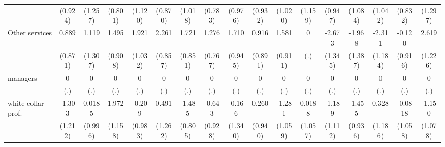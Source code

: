 {\begin{tabular}{l*{16}{c}}
                    &     (0.924)         &     (1.257)         &     (0.801)         &     (1.120)         &     (0.870)         &     (1.018)         &     (0.783)         &     (0.976)         &     (0.932)         &     (1.020)         &     (1.159)         &     (0.947)         &     (1.084)         &     (1.042)         &     (0.832)         &     (1.297)         \\
[1em]
Other services      &       0.889         &       1.119         &       1.495         &       1.921         &       2.261\sym{**} &       1.721\sym{*}  &       1.276         &       1.710         &       0.916         &       1.581         &           0         &      -2.673\sym{*}  &      -1.968         &      -2.311         &      -0.120         &       2.619\sym{*}  \\
                    &     (0.871)         &     (1.307)         &     (0.908)         &     (1.032)         &     (0.857)         &     (0.851)         &     (0.767)         &     (0.945)         &     (0.891)         &     (0.911)         &         (.)         &     (1.345)         &     (1.387)         &     (1.184)         &     (0.916)         &     (1.226)         \\
[1em]
managers            &           0         &           0         &           0         &           0         &           0         &           0         &           0         &           0         &           0         &           0         &           0         &           0         &           0         &           0         &           0         &           0         \\
                    &         (.)         &         (.)         &         (.)         &         (.)         &         (.)         &         (.)         &         (.)         &         (.)         &         (.)         &         (.)         &         (.)         &         (.)         &         (.)         &         (.)         &         (.)         &         (.)         \\
[1em]
white collar - prof.&      -1.303         &      0.0185         &       1.972         &      -0.209         &       0.491         &      -1.485         &      -0.643         &      -0.166         &       0.260         &      -1.281         &      0.0188         &      -1.189         &      -1.455         &       0.328         &     -0.0818         &      -1.150         \\
                    &     (1.212)         &     (0.996)         &     (1.158)         &     (0.983)         &     (1.262)         &     (0.805)         &     (0.928)         &     (1.340)         &     (0.940)         &     (1.059)         &     (1.057)         &     (1.112)         &     (0.936)         &     (1.186)         &     (1.058)         &     (1.078)         \\

\end{tabular}}
